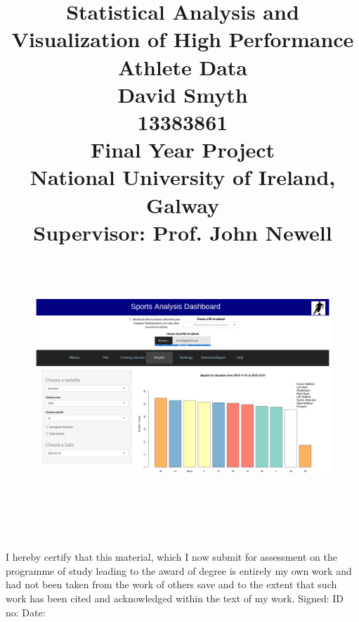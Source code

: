 \documentclass[a4paper, 12pt, twoside]{report}
\begin{document}
	\title{ %
		\textbf{Statistical Analysis and Visualization of High Performance Athlete Data} \\
		\hfill\break
		\large
		\textbf{David Smyth}\\ 
		13383861\\
		\hfill\break
		Final Year Project\\
		National University of Ireland, Galway\\
		Supervisor: Prof. John Newell\\
		\begin{figure}[!b]
			\centering
			\includegraphics[width=0.8\linewidth, height=9cm]{Images/CoverPage.png}
		\end{figure}
	}
	\maketitle
	
	
	\newpage
	\vspace*{\fill}
	I hereby certify that this material, which I now submit for assessment on the programme of study leading to the award of degree is entirely my own work and had not been taken from the work of others save and to the extent that such work has been cited and acknowledged within the text of my work.
	\hfill\break	
	\newline
	Signed:\hspace{0.2cm} \makebox[1.5in]{\hrulefill}
	\hspace{0.4cm} ID no:\hspace{0.2cm} \makebox[1.5in]{\hrulefill}     
	\newline
	Date:\hspace{0.2cm} \makebox[1.5in]{\hrulefill}
	\vspace*{\fill}
	\newpage
	
\end{document}

